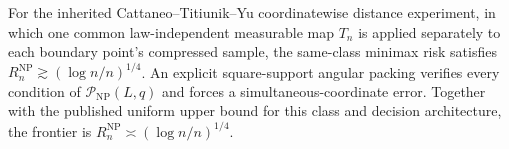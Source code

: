 For the inherited Cattaneo--Titiunik--Yu coordinatewise distance experiment, in which one common law-independent measurable map \(T_n\) is applied separately to each boundary point's compressed sample, the same-class minimax risk satisfies \(R_n^{\mathrm{NP}}\gtrsim(\log n/n)^{1/4}\).  An explicit square-support angular packing verifies every condition of \(\mathcal P_{\mathrm{NP}}(L,q)\) and forces a simultaneous-coordinate error.  Together with the published uniform upper bound for this class and decision architecture, the frontier is \(R_n^{\mathrm{NP}}\asymp(\log n/n)^{1/4}\).
